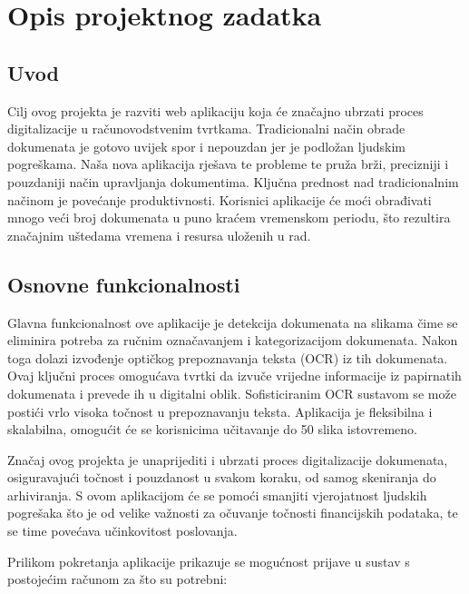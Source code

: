\chapter{Opis projektnog zadatka}
				
		\section{Uvod}
		Cilj ovog projekta je razviti web aplikaciju koja će značajno ubrzati proces digitalizacije u računovodstvenim tvrtkama. Tradicionalni način obrade dokumenata je gotovo uvijek spor i nepouzdan jer je podložan ljudskim pogreškama. Naša nova aplikacija rješava te probleme te pruža brži, precizniji i pouzdaniji način upravljanja dokumentima. Ključna prednost nad tradicionalnim načinom je povećanje produktivnosti. Korisnici aplikacije će moći obrađivati mnogo veći broj dokumenata u puno kraćem vremenskom periodu, što rezultira značajnim uštedama vremena i resursa uloženih u rad.
		
		\section{Osnovne funkcionalnosti}
		Glavna funkcionalnost ove aplikacije je detekcija dokumenata na slikama čime se eliminira potreba za ručnim označavanjem i kategorizacijom dokumenata. Nakon toga dolazi izvođenje optičkog prepoznavanja teksta (OCR) iz tih dokumenata. Ovaj ključni proces omogućava tvrtki da izvuče vrijedne informacije iz papirnatih dokumenata i prevede ih u digitalni oblik. Sofisticiranim OCR sustavom se može postići vrlo visoka točnost u prepoznavanju teksta. Aplikacija je fleksibilna i skalabilna, omogućit će se korisnicima učitavanje do 50 slika istovremeno.
		
		Značaj ovog projekta je unaprijediti i ubrzati proces digitalizacije dokumenata, osiguravajući točnost i pouzdanost u svakom koraku, od samog skeniranja do arhiviranja. S ovom aplikacijom će se pomoći smanjiti vjerojatnost ljudskih pogrešaka što je od velike važnosti za očuvanje točnosti financijskih podataka, te se time povećava učinkovitost poslovanja.
		
		Prilikom pokretanja aplikacije prikazuje se mogućnost prijave u sustav s postojećim računom za što su potrebni:
		\begin{packed_item}
			\item {}
			\item {}
		\end{packed_item}


